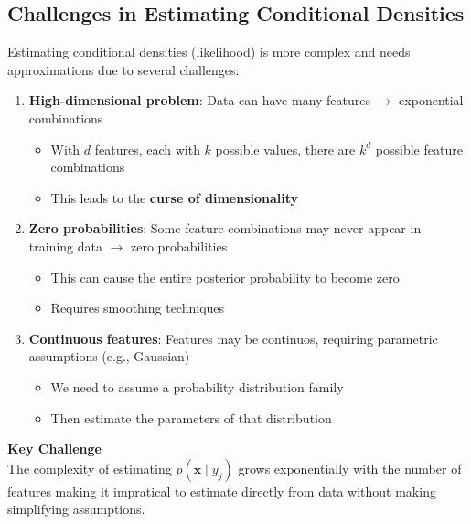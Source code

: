\documentclass[a4paper]{article}
\theoremstyle{definition}
\begin{document}
\subsection{Challenges in Estimating Conditional Densities}
Estimating conditional densities (likelihood) is more complex and needs approximations due to several challenges:
\begin{enumerate}
    \item \textbf{High-dimensional problem}: Data can have many features \( \rightarrow \) exponential combinations
    \begin{itemize}
        \item With \( d \) features, each with \( k \) possible values, there are \( k^d \) possible feature combinations 
        \item This leads to the \textbf{curse of dimensionality}
    \end{itemize}
    \item \textbf{Zero probabilities}: Some feature combinations may never appear in training data \( \rightarrow \) zero probabilities
    \begin{itemize}
        \item This can cause the entire posterior probability to become zero 
        \item Requires smoothing techniques
    \end{itemize}
    \item \textbf{Continuous features}: Features may be continuos, requiring parametric assumptions (e.g., Gaussian)
    \begin{itemize}
        \item We need to assume a probability distribution family 
        \item Then estimate the parameters of that distribution
    \end{itemize}
\end{enumerate}
\begin{tcolorbox}[
    colback=yellow!15!white,
    colframe=yellow!15!white,
    boxrule=0pt,
    arc=0pt,
    halign=center
]
    \textbf{Key Challenge}\\[0.6em]
    The complexity of estimating \( p(\mathbf{x} \mid y_j) \) grows exponentially with the number of features 
    making it impratical to estimate directly from data without making simplifying assumptions.
\end{tcolorbox}
\end{document}
